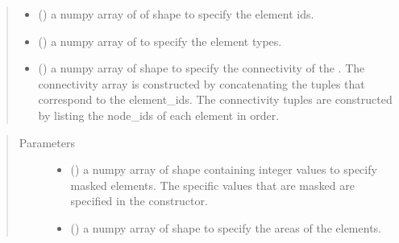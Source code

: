 \documentclass[letterpaper,10pt,english]{sphinxmanual}
\begin{document}
\begin{fulllineitems}
\begin{fulllineitems}
\begin{quote}
\begin{description}
\begin{itemize}
\item {} 
 () \textendash{} a numpy array of of shape
 to specify the element ids.

\item {} 
 () \textendash{} a numpy array of
 to specify the element types.

\item {} 
 () \textendash{} a numpy array of shape
 to specify the connectivity of the
{\hyperref[\detokenize{mesh:ESMF.api.mesh.Mesh}]{}}. The connectivity array is constructed by concatenating the
tuples that correspond to the element\_ids. The connectivity tuples
are constructed by listing the node\_ids of each element in
 order.

\end{itemize}

\end{description}\end{quote}

\begin{quote}\begin{description}
\item[{Parameters}] \leavevmode\begin{itemize}
\item {} 
 () \textendash{} a numpy array of shape
 containing integer values to specify masked
elements. The specific values that are masked are specified in the
{\hyperref[\detokenize{regrid:ESMF.api.regrid.Regrid}]{}} constructor.

\item {} 
 () \textendash{} a numpy array of shape
 to specify the areas of the elements.


\end{itemize}
\end{description}
\end{quote}
\end{fulllineitems}
\end{fulllineitems}
\end{document}
